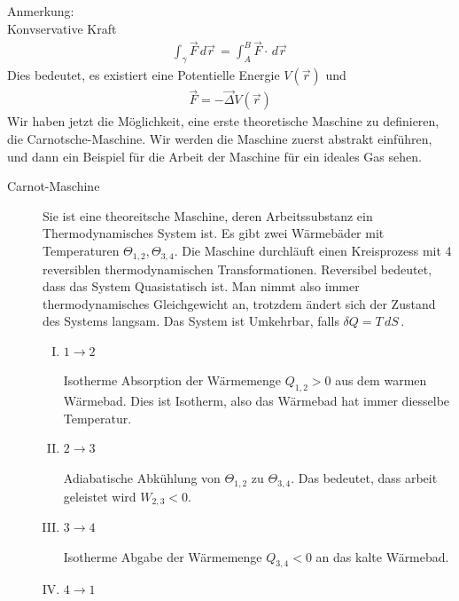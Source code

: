\documentclass[11pt]{article}
\theoremstyle{plain}
\theoremstyle{mytheoremstyle}
\renewcommand{\d}[1]{\,d#1\,}
\begin{document}
Anmerkung: \\
Konvservative Kraft
%
\begin{align*}
  \int_{\gamma}^{} \vec{F} \d{\vec{r}} = \int_{A}^{B} \vec{F} \cdot \d{\vec{r}}
\end{align*}
%
Dies bedeutet, es existiert eine Potentielle Energie $V(\vec{r})$ und
%
\begin{align*}
  \vec{F} = - \vec{\Delta} V(\vec{r}) 
\end{align*}
%
Wir haben jetzt die M\"oglichkeit, eine erste theoretische Maschine zu definieren,
die Carnotsche-Maschine. Wir werden die Maschine zuerst abstrakt einf\"uhren, 
und dann ein Beispiel f\"ur die Arbeit der Maschine f\"ur ein ideales Gas sehen.
\begin{description}
  \item[Carnot-Maschine] 
    Sie ist eine theoreitsche Maschine, deren Arbeitssubstanz
    ein Thermodynamisches System ist. Es gibt zwei W\"armeb\"ader mit Temperaturen
    $\Theta_{1,2}, \Theta_{3,4}$. Die Maschine durchl\"auft einen Kreisprozess mit
    4 reversiblen thermodynamischen Transformationen.
    Reversibel bedeutet, dass das System Quasistatisch ist. Man nimmt also 
    immer thermodynamisches Gleichgewicht an, trotzdem \"andert sich der Zustand des Systems
    langsam.
    Das System ist Umkehrbar, falls $\delta Q = T \d{S}$.
    \begin{enumerate}[I)]
      \item $1\to2$ 
        
        Isotherme Absorption der W\"armemenge $Q_{1,2} > 0$ aus dem warmen
        W\"armebad. Dies ist Isotherm, also das W\"armebad hat immer diesselbe Temperatur.

      \item $2\to3$
        
        Adiabatische Abk\"uhlung von $\Theta_{1,2}$ zu $\Theta_{3,4}$.
        Das bedeutet, dass arbeit geleistet wird $W_{2,3} < 0$.

      \item $3\to4$

        Isotherme Abgabe der W\"armemenge $Q_{3,4} < 0$ an das kalte W\"armebad.

      \item $4\to1$


\end{enumerate}
\end{description}
\end{document}
